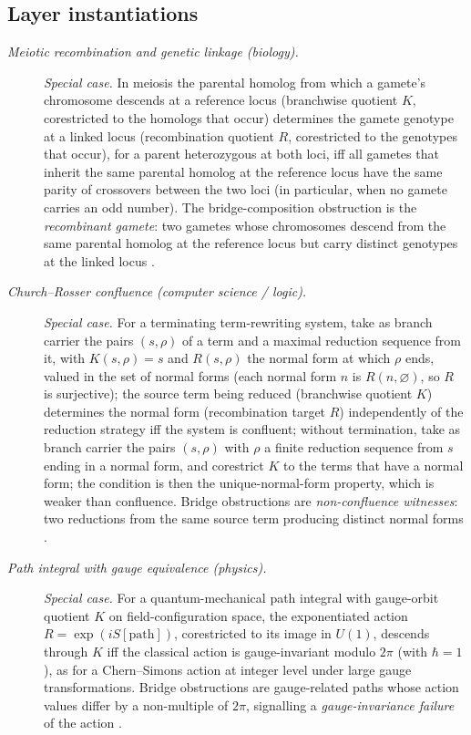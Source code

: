 \subsection*{Layer instantiations}\label{layer-inst:F5}

\begingroup\small
\begin{description}
\item[\emph{Meiotic recombination and genetic linkage (biology).}] \textit{Special case.}
In meiosis the parental homolog from which a gamete's chromosome
descends at a reference locus (branchwise quotient \(K\), corestricted to the homologs that occur) determines the
gamete genotype at a linked locus (recombination quotient \(R\), corestricted to the genotypes that occur), for a parent
heterozygous at both loci, iff all gametes that inherit the same parental
homolog at the reference locus have the same parity of crossovers between the
two loci (in particular, when no gamete carries an odd number).  The bridge-composition
obstruction is the \emph{recombinant gamete}: two gametes whose
chromosomes descend from the same parental homolog at the reference
locus but carry distinct genotypes at the linked locus
\citep{Morgan1911Coupling}.

\item[\emph{Church--Rosser confluence (computer science / logic).}] \textit{Special case.}
For a terminating term-rewriting system, take as branch carrier the pairs
\((s,\rho)\) of a term and a maximal reduction sequence from it, with
\(K(s,\rho)=s\) and \(R(s,\rho)\) the normal form at which \(\rho\) ends, valued in the set of normal forms (each normal form \(n\) is \(R(n,\varnothing)\), so \(R\) is surjective); the source term being reduced
(branchwise quotient \(K\)) determines the normal form
(recombination target \(R\)) independently of the reduction
strategy iff the system is confluent; without termination, take as branch
carrier the pairs \((s,\rho)\) with \(\rho\) a finite reduction sequence from \(s\)
ending in a normal form, and corestrict \(K\) to the terms that have a normal
form; the condition is then the unique-normal-form property, which is weaker
than confluence.  Bridge obstructions are
\emph{non-confluence witnesses}: two reductions from the same
source term producing distinct normal forms
\citep{ChurchRosser1936Conversion}.

\item[\emph{Path integral with gauge equivalence (physics).}] \textit{Special case.}
For a quantum-mechanical path integral with gauge-orbit
quotient \(K\) on field-configuration space, the exponentiated
action \(R = \exp(iS[\text{path}])\), corestricted to its image in \(U(1)\), descends through \(K\) iff
the classical action is gauge-invariant modulo \(2\pi\) (with
\(\hbar=1\)), as for a Chern--Simons action at integer level under
large gauge transformations.  Bridge obstructions are gauge-related
paths whose action values differ by a non-multiple of \(2\pi\), signalling a
\emph{gauge-invariance failure} of the action
\citep{FeynmanHibbs1965PathIntegrals}.


\end{description}
